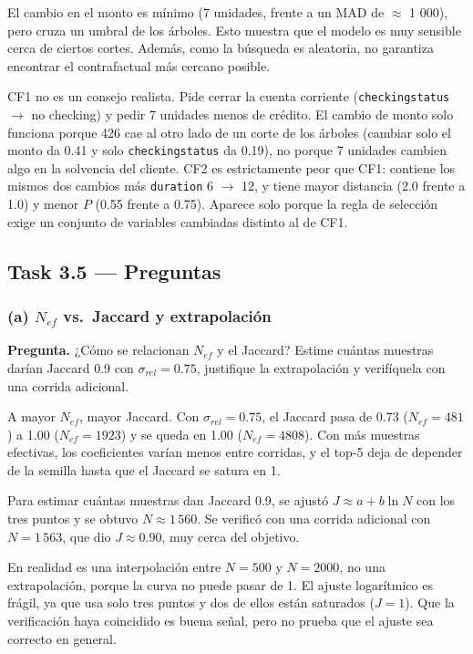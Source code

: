 \documentclass[11pt]{article}
\renewcommand{\_}{\textunderscore\allowbreak{}}
\begin{document}
El cambio en el monto es mínimo (7 unidades, frente a un MAD de \(\approx\) 1 000), pero cruza un umbral de los árboles. Esto muestra que el modelo es muy sensible cerca de ciertos cortes. Además, como la búsqueda es aleatoria, no garantiza encontrar el contrafactual más cercano posible.

CF1 no es un consejo realista. Pide cerrar la cuenta corriente (\texttt{checking\_status} \(\rightarrow\) no checking) y pedir 7 unidades menos de crédito. El cambio de monto solo funciona porque 426 cae al otro lado de un corte de los árboles (cambiar solo el monto da 0.41 y solo \texttt{checking\_status} da 0.19), no porque 7 unidades cambien algo en la solvencia del cliente. CF2 es estrictamente peor que CF1: contiene los mismos dos cambios más \texttt{duration} 6 \(\rightarrow\) 12, y tiene mayor distancia (2.0 frente a 1.0) y menor \(P\) (0.55 frente a 0.75). Aparece solo porque la regla de selección exige un conjunto de variables cambiadas distinto al de CF1.

\subsection*{Task 3.5 --- Preguntas}
\subsubsection*{(a) $N_{ef}$ vs.\ Jaccard y extrapolación}
\begin{tcolorbox}[colback=yellow!12, colframe=orange!70!black, boxrule=0.5pt, left=4pt, right=4pt]
\textbf{Pregunta.} ¿Cómo se relacionan \(N_{ef}\) y el Jaccard? Estime cuántas muestras darían Jaccard 0.9 con \(\sigma_{rel}=0.75\), justifique la extrapolación y verifíquela con una corrida adicional.
\end{tcolorbox}

A mayor \(N_{ef}\), mayor Jaccard. Con \(\sigma_{rel} = 0.75\), el Jaccard pasa de 0.73 (\(N_{ef} = 481\)) a 1.00 (\(N_{ef} = 1923\)) y se queda en 1.00 (\(N_{ef} = 4808\)). Con más muestras efectivas, los coeficientes varían menos entre corridas, y el top-5 deja de depender de la semilla hasta que el Jaccard se satura en 1.

Para estimar cuántas muestras dan Jaccard 0.9, se ajustó \(J \approx a + b \ln N\) con los tres puntos y se obtuvo \(N \approx 1\,560\). Se verificó con una corrida adicional con \(N = 1\,563\), que dio \(J \approx 0.90\), muy cerca del objetivo.

En realidad es una interpolación entre \(N = 500\) y \(N = 2000\), no una extrapolación, porque la curva no puede pasar de 1. El ajuste logarítmico es frágil, ya que usa solo tres puntos y dos de ellos están saturados (\(J = 1\)). Que la verificación haya coincidido es buena señal, pero no prueba que el ajuste sea correcto en general.
\end{document}

